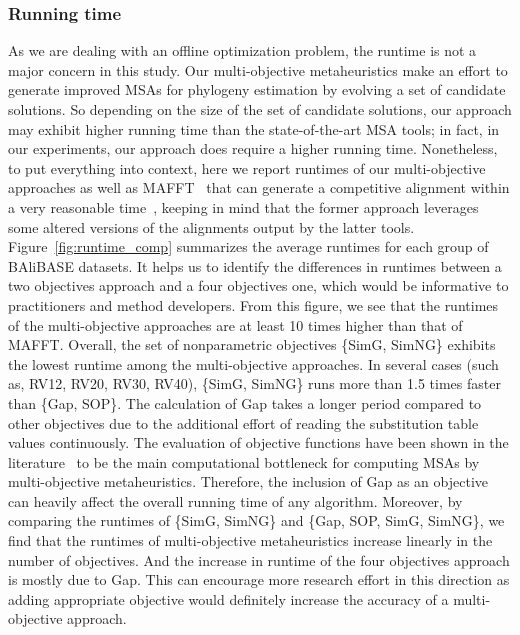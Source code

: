 \subsubsection{Running time}\label{sec:run}
As we are dealing with an offline optimization problem, the runtime is not a major concern in this study. Our multi-objective metaheuristics make an effort to generate improved MSAs for phylogeny estimation by evolving a set of candidate solutions. So depending on the size of the set of candidate solutions, our approach may exhibit higher running time than the state-of-the-art MSA tools; in fact, in our experiments, our approach does require a higher running time. Nonetheless, to put everything into context, here we report runtimes of our multi-objective approaches as well as MAFFT~\citep{katoh2002mafft} that can generate a competitive alignment within a very reasonable time~\citep{ashkenazy2018multiple}, keeping in mind that the former approach leverages some altered versions of the alignments output by the latter tools. Figure~\ref{fig:runtime_comp} summarizes the average runtimes for each group of BAliBASE datasets. It helps us to identify the differences in runtimes between a two objectives approach and a four objectives one, which would be informative to practitioners and method developers. From this figure, we see that the runtimes of the multi-objective approaches are at least 10 times higher than that of MAFFT. Overall, the set of nonparametric objectives \{SimG, SimNG\} exhibits the lowest runtime among the multi-objective approaches. In several cases (such as, RV12, RV20, RV30, RV40), \{SimG, SimNG\} runs more than 1.5 times faster than \{Gap, SOP\}. The calculation of Gap takes a longer period compared to other objectives due to the additional effort of reading the substitution table values continuously. The evaluation of objective functions have been shown in the literature~\citep{zambrano2017m2align} to be the main computational bottleneck for computing MSAs by multi-objective metaheuristics. Therefore, the inclusion of Gap as an objective can heavily affect the overall running time of any algorithm. Moreover, by comparing the runtimes of \{SimG, SimNG\} and \{Gap, SOP, SimG, SimNG\}, we find that the runtimes of multi-objective metaheuristics increase linearly in the number of objectives. And the increase in runtime of the four objectives approach is mostly due to Gap. This can encourage more research effort in this direction as adding appropriate objective would definitely increase the accuracy of a multi-objective approach.

